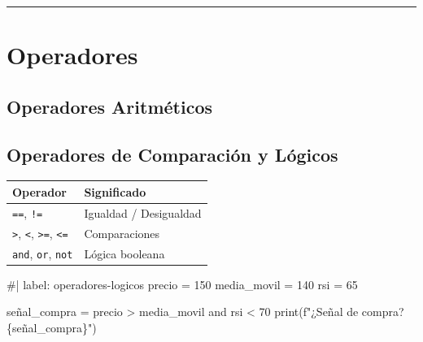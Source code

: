 \documentclass[
  spanish,
  letterpaper,
  DIV=11,
  numbers=noendperiod]{scrreprt}
\newenvironment{Shaded}{\begin{snugshade}}{\end{snugshade}}
\newcommand{\NormalTok}[1]{\textcolor[rgb]{0.00,0.23,0.31}{#1}}
\begin{document}
\begin{center}\rule{0.5\linewidth}{0.5pt}\end{center}

\section{Operadores}\label{operadores}

\subsection{Operadores Aritméticos}\label{operadores-aritmuxe9ticos}

\begin{Shaded}
\end{Shaded}

\subsection{Operadores de Comparación y
Lógicos}\label{operadores-de-comparaciuxf3n-y-luxf3gicos}

\begin{longtable}[]{@{}ll@{}}
\toprule\noalign{}
Operador & Significado \\
\midrule\noalign{}
\endhead
\bottomrule\noalign{}
\endlastfoot
\texttt{==}, \texttt{!=} & Igualdad / Desigualdad \\
\texttt{\textgreater{}}, \texttt{\textless{}}, \texttt{\textgreater{}=},
\texttt{\textless{}=} & Comparaciones \\
\texttt{and}, \texttt{or}, \texttt{not} & Lógica booleana \\
\end{longtable}

\begin{Shaded}
\begin{Highlighting}[]
\NormalTok{\#| label: operadores{-}logicos}
\NormalTok{precio = 150}
\NormalTok{media\_movil = 140}
\NormalTok{rsi = 65}

\NormalTok{señal\_compra = precio \textgreater{} media\_movil and rsi \textless{} 70}
\NormalTok{print(f"¿Señal de compra? \{señal\_compra\}")}
\end{Highlighting}
\end{Shaded}
\end{document}
